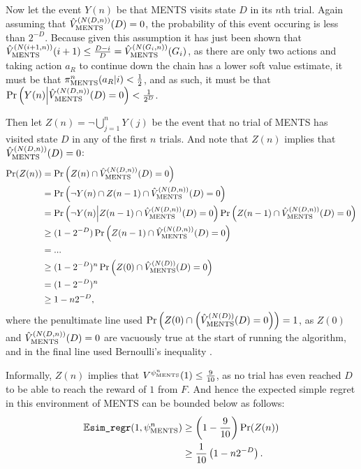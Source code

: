 \begin{proofoutline}
            Now let the event $Y(n)$ be that MENTS visits state $D$ in its $n$th trial. Again assuming that ${\hat{V}^{(N(D,n))}_{{\textnormal{MENTS}}}}(D)=0$, the probability of this event occuring is less than $2^{-D}$. Because given this assumption it has just been shown that ${\hat{V}^{(N(i+1,n))}_{{\textnormal{MENTS}}}}(i+1)\leq \frac{D-i}{D} = {\hat{V}^{(N(G_{i},n))}_{{\textnormal{MENTS}}}}(G_{i})$,  as there are only two actions and taking action $a_R$ to continue down the chain has a lower soft value estimate, it must be that ${\pi^{n}_{{\textnormal{MENTS}}}}(a_R|i) < \frac{1}{2}$, and as such, it must be that $\Pr\left(Y(n) \middle| {\hat{V}^{(N(D,n))}_{{\textnormal{MENTS}}}}(D)=0\right) < \frac{1}{2^D}$. 
            
            Then let $Z(n)=\neg \bigcup_{j=1}^n Y(j)$ be the event that no trial of MENTS has visited state $D$ in any of the first $n$ trials. And note that $Z(n)$ implies that ${\hat{V}^{(N(D,n))}_{{\textnormal{MENTS}}}}(D)=0$: 
            \begin{align}
                \Pr(Z(n)) 
                    &= \Pr\left(Z(n) \cap {\hat{V}^{(N(D,n))}_{{\textnormal{MENTS}}}}(D)=0\right) \\
                    &= \Pr\left(\neg Y(n) \cap Z(n-1) \cap {\hat{V}^{(N(D,n))}_{{\textnormal{MENTS}}}}(D) = 0  \right) \\
                    &= \Pr\left(\neg Y(n) \middle| Z(n-1) \cap {\hat{V}^{(N(D,n))}_{{\textnormal{MENTS}}}}(D) = 0 \right) 
                        \Pr\left( Z(n-1) \cap {\hat{V}^{(N(D,n))}_{{\textnormal{MENTS}}}}(D) = 0 \right) \\
                    &\geq (1-2^{-D}) \Pr\left( Z(n-1) \cap {\hat{V}^{(N(D,n))}_{{\textnormal{MENTS}}}}(D) = 0 \right) \\
                    &= ... \\
                    &\geq (1-2^{-D})^n \Pr\left( Z(0) \cap {\hat{V}^{(N(D))}_{{\textnormal{MENTS}}}}(D)=0\right) \\
                    &= (1-2^{-D})^n \\
                    &\geq 1-n2^{-D},
            \end{align}
            where the penultimate line used $\Pr\left( Z(0) \cap \left({\hat{V}^{(N(D))}_{{\textnormal{MENTS}}}}(D)=0\right)\right)=1$, as $Z(0)$ and ${\hat{V}^{(N(D,n))}_{{\textnormal{MENTS}}}}(D)=0$ are vacuously true at the start of running the algorithm, and in the final line used Bernoulli's inequality .
            
            Informally, $Z(n)$ implies that $V^{\psi^{n}_{{\textnormal{MENTS}}}}(1) \leq \frac{9}{10}$, as no trial has even reached $D$ to be able to reach the reward of $1$ from $F$. And hence the expected simple regret in this environment of MENTS can be bounded below as follows:
            \begin{align}
                \mathbb{E}{\textnormal{\texttt{sim\_regr}}}(1,\psi^n_{\text{MENTS}}) 
                    & \geq \left(1-\frac{9}{10}\right) \Pr(Z(n)) \\
                    & \geq \frac{1}{10} \left( 1-n2^{-D} \right).
            \end{align}
            

\end{proofoutline}
